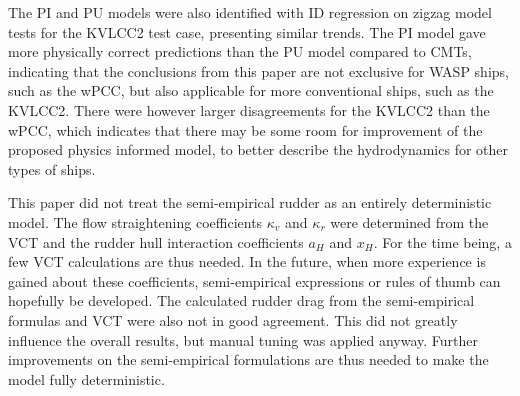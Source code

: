 The PI and PU models were also identified with ID regression on zigzag model tests for the KVLCC2 test case, presenting similar trends. The PI model gave more physically correct predictions than the PU model compared to CMTs, indicating that the conclusions from this paper are not exclusive for WASP ships, such as the wPCC, but also applicable for more conventional ships, such as the KVLCC2. There were however larger disagreements for the KVLCC2 than the wPCC, which indicates that there may be some room for improvement of the proposed physics informed model, to better describe the hydrodynamics for other types of ships.   

This paper did not treat the semi-empirical rudder as an entirely deterministic model. The flow straightening coefficients $\kappa_v$ and $\kappa_r$ were determined from the VCT and the rudder hull interaction coefficients $a_H$ and $x_H$. For the time being, a few VCT calculations are thus needed.
In the future, when more experience is gained about these coefficients, semi-empirical expressions or rules of thumb can hopefully be developed.
The calculated rudder drag from the semi-empirical formulas and VCT were also not in good agreement.
This did not greatly influence the overall results, but manual tuning was applied anyway.
Further improvements on the semi-empirical formulations are thus needed to make the model fully deterministic.
